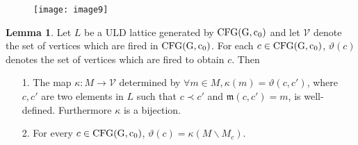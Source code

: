 \documentclass{article}
\theoremstyle{definition}
\newtheorem{lem}{Lemma}
\newcommand\meetirrdiff[2]{\mathfrak{m}(#1,#2)}
\begin{document}
\begin{figure}[!h]
\centering
\texttt{[image: image9]}
\end{figure}
\begin{lem}
\label{lemma of relation}
Let $L$ be a ULD lattice generated by ${\rm CFG(G,c_0)}$ and let $\mathcal{V}$ denote the set of vertices which are fired in ${\rm CFG(G,c_0)}$. For each $c \in {\rm CFG(G,c_0)}$, $\vartheta(c)$ denotes the set of vertices which are fired to obtain $c$.   Then
\begin{itemize}
  \item[1. ]  The map $\kappa: M\to \mathcal{V}$ determined by $\forall m \in M, \kappa(m)=\vartheta(c,c')$, where $c,c'$ are two elements in $L$ such that $c \prec c'$ and $\meetirrdiff{c}{c'}=m$, is well-defined. Furthermore $\kappa$ is a bijection.
  \item[2. ] For every $c\in {\rm CFG(G,c_0)}$, $\vartheta(c)=\kappa(M\backslash  M_{c}) $.
\end{itemize}  
\end{lem}
\end{document}
